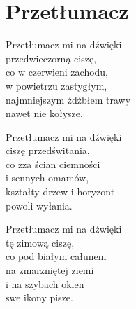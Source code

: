 \section{Przetłumacz}
\begin{text}
Przetłumacz mi na dźwięki\\
przedwieczorną ciszę,\\
co w czerwieni zachodu,\\
w powietrzu zastygłym,\\
najmniejszym źdźbłem trawy\\
nawet nie kołysze.

Przetłumacz mi na dźwięki\\
ciszę przedświtania,\\
co zza ścian ciemności\\
i sennych omamów,\\
kształty drzew i horyzont\\
powoli wyłania.

Przetłumacz mi na dźwięki\\
tę zimową ciszę,\\
co pod białym całunem\\
na zmarzniętej ziemi\\
i na szybach okien\\
swe ikony pisze.
\end{text}